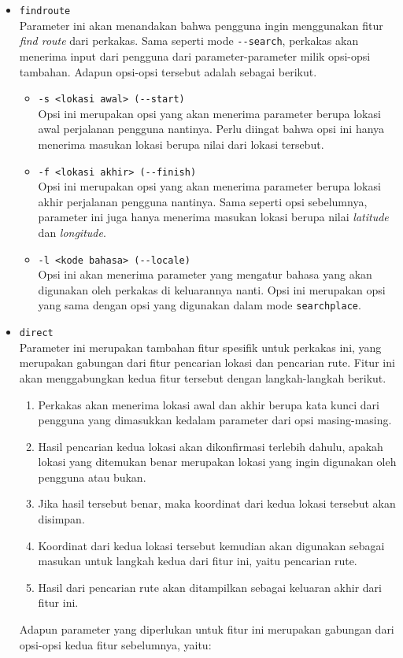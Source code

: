 \begin{itemize}
\begin{itemize}
		\item \verb|findroute|\\
		Parameter ini akan menandakan bahwa pengguna ingin menggunakan fitur \textit{find route} dari perkakas. Sama seperti mode \verb|--search|, perkakas akan menerima input dari pengguna dari parameter-parameter milik opsi-opsi tambahan. Adapun opsi-opsi tersebut adalah sebagai berikut.
		
		\begin{itemize}
			\item \verb|-s <lokasi awal> (--start)|\\
			Opsi ini merupakan opsi yang akan menerima parameter berupa lokasi awal perjalanan pengguna nantinya. Perlu diingat bahwa opsi ini hanya menerima masukan lokasi berupa nilai \latlon dari lokasi tersebut.
			\item \verb|-f <lokasi akhir> (--finish)|\\
			Opsi ini merupakan opsi yang akan menerima parameter berupa lokasi akhir perjalanan pengguna nantinya. Sama seperti opsi sebelumnya, parameter ini juga hanya menerima masukan lokasi berupa nilai \textit{latitude} dan \textit{longitude}.
			\item \verb|-l <kode bahasa> (--locale)|\\
			Opsi ini akan menerima parameter yang mengatur bahasa yang akan digunakan oleh perkakas di keluarannya nanti. Opsi ini merupakan opsi yang sama dengan opsi yang digunakan dalam mode \verb|searchplace|.
		\end{itemize}
		
		\item \verb|direct|\\
		Parameter ini merupakan tambahan fitur spesifik untuk perkakas ini, yang merupakan gabungan dari fitur pencarian lokasi dan pencarian rute. Fitur ini akan menggabungkan kedua fitur tersebut dengan langkah-langkah berikut.
		
		\begin{enumerate}
			\item Perkakas akan menerima lokasi awal dan akhir berupa kata kunci dari pengguna yang dimasukkan kedalam parameter dari opsi masing-masing.
			\item Hasil pencarian kedua lokasi akan dikonfirmasi terlebih dahulu, apakah lokasi yang ditemukan benar merupakan lokasi yang ingin digunakan oleh pengguna atau bukan.
			\item Jika hasil tersebut benar, maka koordinat \latlon dari kedua lokasi tersebut akan disimpan.
			\item Koordinat \latlon dari kedua lokasi tersebut kemudian akan digunakan sebagai masukan untuk langkah kedua dari fitur ini, yaitu pencarian rute.
			\item Hasil dari pencarian rute akan ditampilkan sebagai keluaran akhir dari fitur ini.
		\end{enumerate}
		\noindent
		Adapun parameter yang diperlukan untuk fitur ini merupakan gabungan dari opsi-opsi kedua fitur sebelumnya, yaitu:
		

\end{itemize}
\end{itemize}
